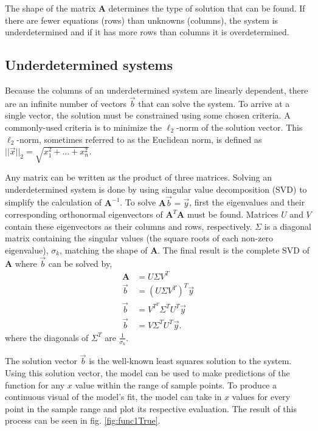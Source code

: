 The shape of the matrix $\mathbf{A}$ determines the type of solution that can be found.  If there are fewer equations (rows) than unknowns (columns), the system is underdetermined and if it has more rows than columns it is overdetermined.  


\subsection{Underdetermined systems}
Because the columns of an underdetermined system are linearly dependent, there are an infinite number of vectors $\vec{b}$ that can solve the system.  To arrive at a single vector, the solution must be constrained using some chosen criteria.  A commonly-used criteria is to minimize the $\ell_2$-norm of the solution vector. This $\ell_2$-norm, sometimes referred to as the Euclidean norm, is defined as $||\vec{x}||_2=\sqrt{x_1^2+\ldots+x_n^2}$.

\par Any matrix can be written as the product of three matrices. Solving an underdetermined system is done by using singular value decomposition (SVD) to simplify the calculation of $\mathbf{A}^{-1}$. To solve $\mathbf{A}\vec{b}=\vec{y}$, first the eigenvalues and their corresponding orthonormal eigenvectors of $\mathbf{A}^T\mathbf{A}$ must be found. Matrices $U$ and $V$ contain these eigenvectors as their columns and rows, respectively. $\Sigma$ is a diagonal matrix containing the singular values (the square roots of each non-zero eigenvalue), $\sigma_k$, matching the shape of $\mathbf{A}$. The final result is the complete SVD of $\mathbf{A}$ where $\vec{b}$ can be solved by,
\begin{align}
\mathbf{A} &= U\Sigma V^T \nonumber \\
\vec{b} &= (U\Sigma V^T)^T\vec{y} \nonumber \\
\vec{b} &= V^{T^T}\Sigma^TU^T\vec{y} \nonumber \\
\vec{b} &= V\Sigma^TU^T\vec{y}.\nonumber 
\end{align}
where the diagonals of $\Sigma^T$ are $\frac{1}{\sigma_k}$.

\par The solution vector $\vec{b}$ is the well-known least squares solution to the system. Using this solution vector, the model can be used to make predictions of the function for any $x$ value within the range of sample points. To produce a continuous visual of the model's fit, the model can take in $x$ values for every point in the sample range and plot its respective evaluation. The result of this process can be seen in fig. \ref{fig:func1True}.

